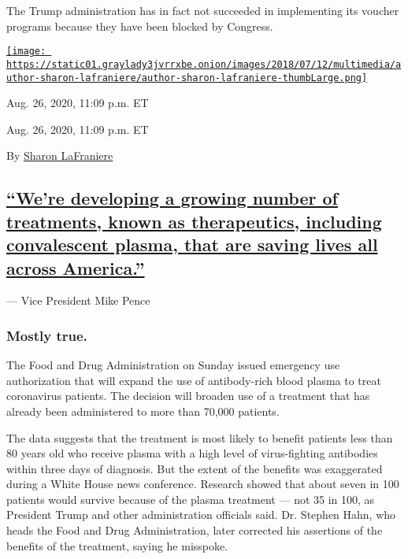 The Trump administration has in fact not succeeded in implementing its
voucher programs because they have been blocked by Congress.

\href{https://www.nytimes3xbfgragh.onion/by/sharon-lafraniere}{\texttt{[image: https://static01.graylady3jvrrxbe.onion/images/2018/07/12/multimedia/author-sharon-lafraniere/author-sharon-lafraniere-thumbLarge.png]}}

Aug. 26, 2020, 11:09 p.m. ET

Aug. 26, 2020, 11:09 p.m. ET

By \href{https://www.nytimes3xbfgragh.onion/by/sharon-lafraniere}{Sharon
LaFraniere}

\hypertarget{were-developing-a-growing-number-of-treatments-known-as-therapeutics-including-convalescent-plasma-that-are-saving-lives-all-across-america}{%
\subsection{\texorpdfstring{\protect\hyperlink{were-developing-a-growing-number-of-treatments-known-as-therapeutics-including-convalescent-plasma-that-are-saving-lives-all-acr}{``We're
developing a growing number of treatments, known as therapeutics,
including convalescent plasma, that are saving lives all across
America.''}}{``We're developing a growing number of treatments, known as therapeutics, including convalescent plasma, that are saving lives all across America.''}}\label{were-developing-a-growing-number-of-treatments-known-as-therapeutics-including-convalescent-plasma-that-are-saving-lives-all-across-america}}

--- Vice President Mike Pence

\hypertarget{mostly-true-1}{%
\subsubsection{Mostly true.}\label{mostly-true-1}}

The Food and Drug Administration on Sunday issued emergency use
authorization that will expand the use of antibody-rich blood plasma to
treat coronavirus patients. The decision will broaden use of a treatment
that has already been administered to more than 70,000 patients.

The data suggests that the treatment is most likely to benefit patients
less than 80 years old who receive plasma with a high level of
virus-fighting antibodies within three days of diagnosis. But the extent
of the benefits was exaggerated during a White House news conference.
Research showed that about seven in 100 patients would survive because
of the plasma treatment --- not 35 in 100, as President Trump and other
administration officials said. Dr. Stephen Hahn, who heads the Food and
Drug Administration, later corrected his assertions of the benefits of
the treatment, saying he misspoke.

